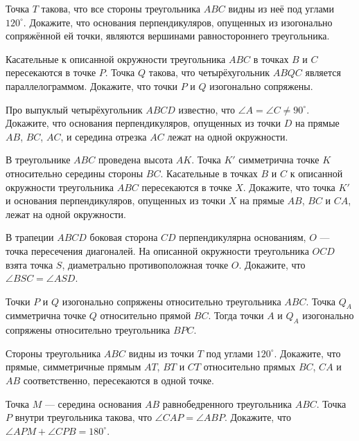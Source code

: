\documentclass{article}
\begin{document}
    \begin{enumerate_boxed}

        \item Точка $T$ такова, что все стороны треугольника $ABC$ видны из неё под углами $120^\circ$.
        Докажите, что основания перпендикуляров, опущенных из изогонально сопряжённой ей точки, являются вершинами равностороннего треугольника.

        \item Касательные к описанной окружности треугольника $ABC$ в точках $B$ и $C$ пересекаются в точке $P$.
        Точка $Q$ такова, что четырёхугольник $ABQC$ является параллелограммом.
        Докажите, что точки $P$ и $Q$ изогонально сопряжены.

        \item Про выпуклый четырёхугольник $ABCD$ известно, что $\angle A=\angle C\neq 90^\circ$.
        Докажите, что основания перпендикуляров, опущенных из точки $D$ на прямые $AB$, $BC$, $AC$, и середина отрезка $AC$ лежат на одной окружности.

        \item  В треугольнике $ABC$ проведена высота $AK$.
        Точка $K'$ симметрична точке $K$ относительно середины стороны $BC$.
        Касательные в точках $B$ и $C$ к описанной окружности треугольника $ABC$ пересекаются в точке $X$.
        Докажите, что точка $K'$ и основания перпендикуляров, опущенных из точки $X$ на прямые $AB$, $BC$ и $CA$, лежат на одной окружности.

        \item В трапеции $ABCD$ боковая сторона $CD$ перпендикулярна основаниям, $O$ — точка пересечения диагоналей.
        На описанной окружности треугольника $OCD$ взята точка $S$, диаметрально противоположная точке $O$.
        Докажите, что $\angle BSC=\angle ASD$.

        \item Точки $P$ и $Q$ изогонально сопряжены относительно треугольника $ABC$.
        Точка $Q_A$ симметрична точке $Q$ относительно прямой $BC$.
        Тогда точки $A$ и $Q_A$ изогонально сопряжены относительно треугольника $BPC$.

        \item Стороны треугольника $ABC$ видны из точки $T$ под углами $120^\circ$.
        Докажите, что прямые, симметричные прямым $AT$, $BT$ и $CT$ относительно прямых $BC$, $CA$ и $AB$ соответственно, пересекаются в одной точке.

        \item Точка $M$ — середина основания $AB$ равнобедренного треугольника $ABC$.
        Точка $P$ внутри треугольника такова, что $\angle CAP=\angle ABP$.
        Докажите, что $\angle APM+\angle CPB=180^\circ$.


\end{enumerate_boxed}
\end{document}
